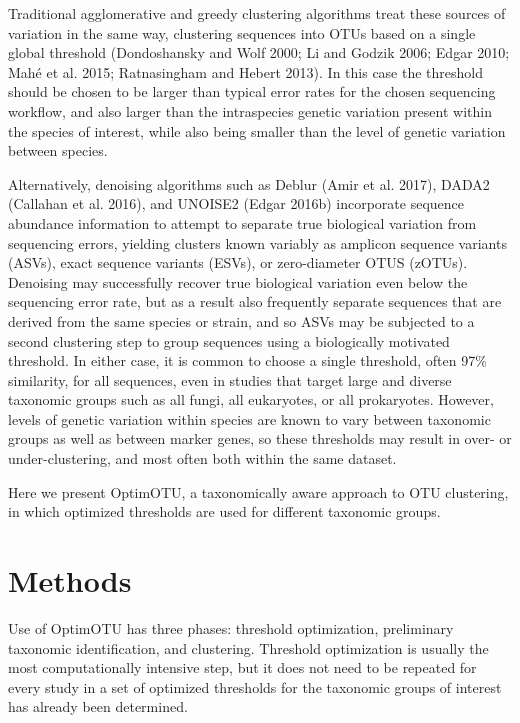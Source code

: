 \documentclass[
]{article}
\begin{document}
Traditional agglomerative and greedy clustering algorithms treat these sources of variation in the same way, clustering sequences into OTUs based on a single global threshold (Dondoshansky and Wolf 2000; Li and Godzik 2006; Edgar 2010; Mahé et al. 2015; Ratnasingham and Hebert 2013).
In this case the threshold should be chosen to be larger than typical error rates for the chosen sequencing workflow, and also larger than the intraspecies genetic variation present within the species of interest, while also being smaller than the level of genetic variation between species.

Alternatively, denoising algorithms such as Deblur (Amir et al. 2017), DADA2 (Callahan et al. 2016), and UNOISE2 (Edgar 2016b) incorporate sequence abundance information to attempt to separate true biological variation from sequencing errors, yielding clusters known variably as amplicon sequence variants (ASVs), exact sequence variants (ESVs), or zero-diameter OTUS (zOTUs).
Denoising may successfully recover true biological variation even below the sequencing error rate, but as a result also frequently separate sequences that are derived from the same species or strain, and so ASVs may be subjected to a second clustering step to group sequences using a biologically motivated threshold.
In either case, it is common to choose a single threshold, often 97\% similarity, for all sequences,
even in studies that target large and diverse taxonomic groups such as all fungi, all eukaryotes, or all prokaryotes.
However, levels of genetic variation within species are known to vary between taxonomic groups as well as between marker genes, so these thresholds may result in over- or under-clustering, and most often both within the same dataset.

Here we present OptimOTU, a taxonomically aware approach to OTU clustering, in which optimized thresholds are used for different taxonomic groups.

\section{Methods}\label{methods}

Use of OptimOTU has three phases: threshold optimization, preliminary taxonomic identification, and clustering.
Threshold optimization is usually the most computationally intensive step, but it does not need to be repeated for every study in a set of optimized thresholds for the taxonomic groups of interest has already been determined.
\end{document}
